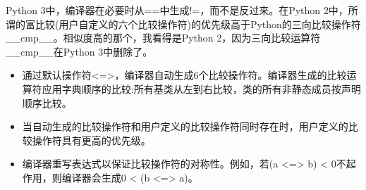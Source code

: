 \begin{tcolorbox}[breakable,enhanced jigsaw,colback=blue!5!white,colframe=blue!75!black,title={与Python的相似性}]
Python 3中，编译器在必要时从==中生成!=，而不是反过来。在Python 2中，所谓的富比较(用户自定义的六个比较操作符)的优先级高于Python的三向比较操作符\_\_cmp\_\_。相似度高的那个，我看得是Python 2，因为三向比较运算符\_\_cmp\_\_在Python 3中删除了。
\end{tcolorbox}	

\begin{tcolorbox}[breakable,enhanced jigsaw,colback=mygreen!5!white,colframe=mygreen!75!black,title={总结}]
\begin{itemize}
\item 
通过默认操作符<=>，编译器自动生成6个比较操作符。编译器生成的比较运算符应用字典顺序的比较:所有基类从左到右比较，类的所有非静态成员按声明顺序比较。

\item 
当自动生成的比较操作符和用户定义的比较操作符同时存在时，用户定义的比较操作符具有更高的优先级。

\item 
编译器重写表达式以保证比较操作符的对称性。例如，若(a <=> b) < 0不起作用，则编译器会生成0 < (b <=> a)。
\end{itemize}
\end{tcolorbox}	

























